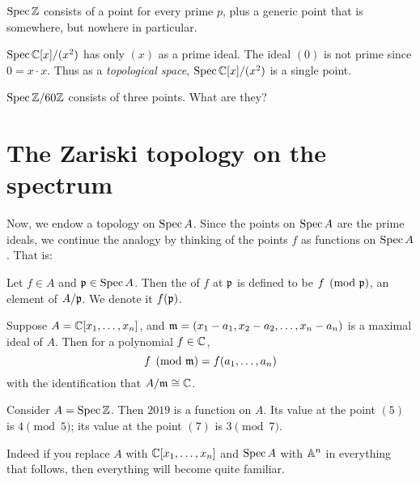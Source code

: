 \begin{example}
	\listhack
	\begin{enumerate}[(a)]
		\ii $\operatorname{Spec} \mathbb Z$ consists of a point for every prime $p$,
		plus a generic point that is somewhere, but nowhere in particular.

		\ii $\operatorname{Spec} \mathbb C[x] / (x^2)$ has only $(x)$ as a prime ideal.
		The ideal $(0)$ is not prime since $0 = x \cdot x$.
		Thus as a \emph{topological space},
		$\operatorname{Spec} \mathbb C[x] / (x^2)$ is a single point.

		\ii $\operatorname{Spec} \mathbb Z/60\mathbb Z$ consists of three points.
		What are they?
	\end{enumerate}
\end{example}

\section{The Zariski topology on the spectrum}

Now, we endow a topology on $\operatorname{Spec} A$.
Since the points on $\operatorname{Spec} A$ are the prime ideals, we continue
the analogy by thinking of the points $f$ as functions on $\operatorname{Spec} A$. That is:
\begin{definition}
	Let $f \in A$ and $\mathfrak p \in \operatorname{Spec} A$.
	Then the  of $f$ at $\mathfrak p$ is defined to be $f \pmod{\mathfrak p}$,
	an element of $A/\mathfrak p$.
	We denote it $f(\mathfrak p)$.
\end{definition}
\begin{example}
	Suppose $A = \mathbb C[x_1, \dots, x_n]$,
	and $\mathfrak m = (x_1-a_1, x_2-a_2, \dots, x_n-a_n)$ is a maximal ideal of $A$.
	Then for a polynomial $f \in \mathbb C$,
	\[ f \pmod {\mathfrak m} = f(a_1, \dots, a_n) \]
	with the identification that $A/\mathfrak m \cong \mathbb C$.
\end{example}
\begin{example}
	Consider $A = \operatorname{Spec} \mathbb Z$.
	Then $2019$ is a function on $A$.
	Its value at the point $(5)$ is $4 \pmod 5$;
	its value at the point $(7)$ is $3 \pmod 7$.
\end{example}

Indeed if you replace $A$ with $\mathbb C[x_1, \dots, x_n]$
and $\operatorname{Spec} A$ with $\mathbb A^n$ in everything that follows,
then everything will become quite familiar.

